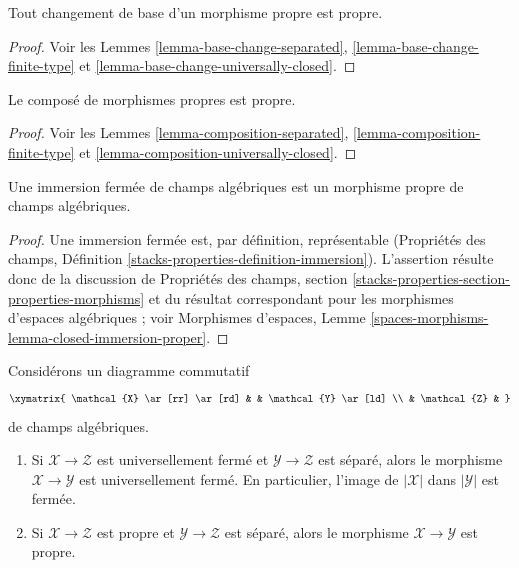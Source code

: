 \begin{lemma}
\label{lemma-base-change-proper}
Tout changement de base d'un morphisme propre est propre.
\end{lemma}

\begin{proof}
Voir les
Lemmes \ref{lemma-base-change-separated},
\ref{lemma-base-change-finite-type} et
\ref{lemma-base-change-universally-closed}.
\end{proof}

\begin{lemma}
\label{lemma-composition-proper}
Le composé de morphismes propres est propre.
\end{lemma}

\begin{proof}
Voir les
Lemmes \ref{lemma-composition-separated},
\ref{lemma-composition-finite-type} et
\ref{lemma-composition-universally-closed}.
\end{proof}

\begin{lemma}
\label{lemma-closed-immersion-proper}
Une immersion fermée de champs algébriques est un morphisme propre de
champs algébriques.
\end{lemma}

\begin{proof}
Une immersion fermée est, par définition, représentable
(Propriétés des champs, Définition
\ref{stacks-properties-definition-immersion}).
L'assertion résulte donc de la discussion de
Propriétés des champs, section
\ref{stacks-properties-section-properties-morphisms}
et du résultat correspondant pour les morphismes d'espaces algébriques ; voir
Morphismes d'espaces, Lemme
\ref{spaces-morphisms-lemma-closed-immersion-proper}.
\end{proof}

\begin{lemma}
\label{lemma-universally-closed-permanence}
Considérons un diagramme commutatif
$$
\xymatrix{
\mathcal{X} \ar[rr] \ar[rd] & &
\mathcal{Y} \ar[ld] \\
& \mathcal{Z} &
}
$$
de champs algébriques.
\begin{enumerate}
\item Si $\mathcal{X} \to \mathcal{Z}$ est universellement fermé et
$\mathcal{Y} \to \mathcal{Z}$ est séparé,
alors le morphisme $\mathcal{X} \to \mathcal{Y}$ est universellement fermé.
En particulier, l'image de $|\mathcal{X}|$ dans $|\mathcal{Y}|$ est fermée.
\item Si $\mathcal{X} \to \mathcal{Z}$ est propre et
$\mathcal{Y} \to \mathcal{Z}$ est séparé, alors
le morphisme $\mathcal{X} \to \mathcal{Y}$ est propre.
\end{enumerate}
\end{lemma}

